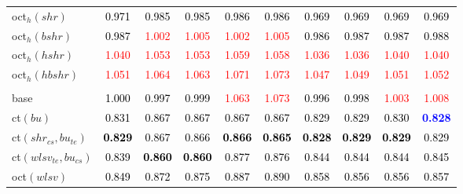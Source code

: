 \begin{tabular}[t]{l|ccccccccc}
oct$_h(shr)$ & \textcolor{black}{0.971} & \textcolor{black}{0.985} & \textcolor{black}{0.985} & \textcolor{black}{0.986} & \textcolor{black}{0.986} & \textcolor{black}{0.969} & \textcolor{black}{0.969} & \textcolor{black}{0.969} & \textcolor{black}{0.969}\\
oct$_h(bshr)$ & \textcolor{black}{0.987} & \textcolor{red}{1.002} & \textcolor{red}{1.005} & \textcolor{red}{1.002} & \textcolor{red}{1.005} & \textcolor{black}{0.986} & \textcolor{black}{0.987} & \textcolor{black}{0.987} & \textcolor{black}{0.988}\\
oct$_h(hshr)$ & \textcolor{red}{1.040} & \textcolor{red}{1.053} & \textcolor{red}{1.053} & \textcolor{red}{1.059} & \textcolor{red}{1.058} & \textcolor{red}{1.036} & \textcolor{red}{1.036} & \textcolor{red}{1.040} & \textcolor{red}{1.040}\\
oct$_h(hbshr)$ & \textcolor{red}{1.051} & \textcolor{red}{1.064} & \textcolor{red}{1.063} & \textcolor{red}{1.071} & \textcolor{red}{1.073} & \textcolor{red}{1.047} & \textcolor{red}{1.049} & \textcolor{red}{1.051} & \textcolor{red}{1.052}\\
\addlinespace[0.3em]
\multicolumn{10}{c}{\textbf{$k = 2$}}\\
base & \textcolor{black}{1.000} & \textcolor{black}{0.997} & \textcolor{black}{0.999} & \textcolor{red}{1.063} & \textcolor{red}{1.073} & \textcolor{black}{0.996} & \textcolor{black}{0.998} & \textcolor{red}{1.003} & \textcolor{red}{1.008}\\
ct$(bu)$ & \textcolor{black}{0.831} & \textcolor{black}{0.867} & \textcolor{black}{0.867} & \textcolor{black}{0.867} & \textcolor{black}{0.867} & \textcolor{black}{0.829} & \textcolor{black}{0.829} & \textcolor{black}{0.830} & \textcolor{blue}{\textbf{0.828}}\\
ct$(shr_{cs}, bu_{te})$ & \textcolor{black}{\textbf{0.829}} & \textcolor{black}{0.867} & \textcolor{black}{0.866} & \textcolor{black}{\textbf{0.866}} & \textcolor{black}{\textbf{0.865}} & \textcolor{black}{\textbf{0.828}} & \textcolor{black}{\textbf{0.829}} & \textcolor{black}{\textbf{0.829}} & \textcolor{black}{0.829}\\
ct$(wlsv_{te}, bu_{cs})$ & \textcolor{black}{0.839} & \textcolor{black}{\textbf{0.860}} & \textcolor{black}{\textbf{0.860}} & \textcolor{black}{0.877} & \textcolor{black}{0.876} & \textcolor{black}{0.844} & \textcolor{black}{0.844} & \textcolor{black}{0.844} & \textcolor{black}{0.845}\\
oct$(wlsv)$ & \textcolor{black}{0.849} & \textcolor{black}{0.872} & \textcolor{black}{0.875} & \textcolor{black}{0.887} & \textcolor{black}{0.890} & \textcolor{black}{0.858} & \textcolor{black}{0.856} & \textcolor{black}{0.856} & \textcolor{black}{0.857}\\

\end{tabular}
